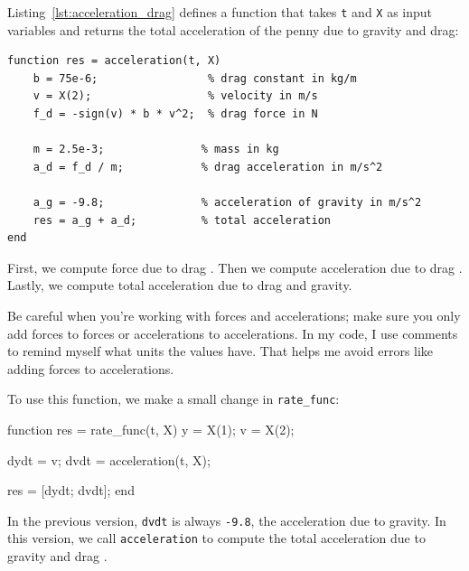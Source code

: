 Listing~\ref{lst:acceleration_drag} defines a function that takes \lstinline{t} and \lstinline{X} as input variables and returns the total acceleration of the penny due to gravity and drag:

\begin{lstlisting}[caption={Calculating acceleration of a penny with drag}, label={lst:acceleration_drag}]
function res = acceleration(t, X)
    b = 75e-6;                 % drag constant in kg/m
    v = X(2);                  % velocity in m/s
    f_d = -sign(v) * b * v^2;  % drag force in N

    m = 2.5e-3;               % mass in kg
    a_d = f_d / m;            % drag acceleration in m/s^2

    a_g = -9.8;               % acceleration of gravity in m/s^2
    res = a_g + a_d;          % total acceleration
end
\end{lstlisting}

First, we compute force due to drag .
Then we compute acceleration due to drag .
Lastly, we compute total acceleration due to drag and \mbox{gravity}.


Be careful when you're working with forces and accelerations; make sure
you only add forces to forces or accelerations to accelerations.  In my
code, I use comments to remind myself what units the values have.
That helps me avoid errors like adding forces to accelerations.

To use this function, we make a small change in \lstinline{rate_func}:

\begin{code}
function res = rate_func(t, X)
    y = X(1);      
    v = X(2);      
    
    dydt = v;
    dvdt = acceleration(t, X);   %

    res = [dydt; dvdt];
end

\end{code}

In the previous version, \lstinline{dvdt} is always \lstinline{-9.8}, the acceleration due to gravity.
In this version, we call \lstinline{acceleration} to compute the total acceleration due to gravity and drag .

